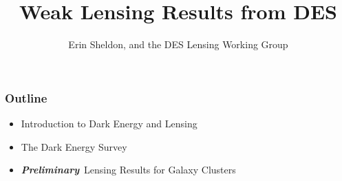 \documentclass{beamer}
\title{Weak Lensing Results from DES}
\author{Erin Sheldon, and the DES Lensing Working Group}
\institute{Brookhaven National Laboratory}
\newcommand{\prelim}{{\bf{\it Preliminary}}}
\begin{document}
\frame{\titlepage}


\frame
{
    \frametitle{Outline}

    \begin{itemize}

        \item Introduction to Dark Energy and Lensing

        \item The Dark Energy Survey

        \item \prelim\ Lensing Results for Galaxy Clusters

    \end{itemize}


}
\end{document}
